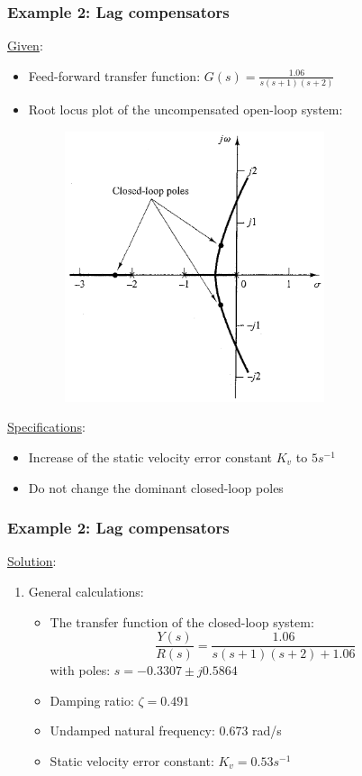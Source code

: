 \begin{frame}
	\frametitle{Example 2: Lag compensators}
	\underline{Given}:
	\begin{itemize}
		\item Feed-forward transfer function: $G(s)=\frac{1.06}{s(s+1)(s+2)}$
		\item Root locus plot of the uncompensated open-loop system:
		\begin{figure}
			\centering
			\includegraphics[width=0.3\linewidth]{Ex2_rootlocus}
		\end{figure}
	\end{itemize}
	\underline{Specifications}:
	\begin{itemize}
		\item Increase of the static velocity error constant $K_v$ to $5s^{-1}$
		\item Do not change the dominant closed-loop poles
	\end{itemize}
\end{frame}

\begin{frame}
	\frametitle{Example 2: Lag compensators}
	\underline{Solution}:
	\begin{enumerate}
		\item General calculations:
		\begin{itemize}
			\item The transfer function of the closed-loop system:
			$$\frac{Y(s)}{R(s)}=\frac{1.06}{s(s+1)(s+2)+1.06}$$ with poles: $s=-0.3307\pm j0.5864$
			\item Damping ratio: $\zeta=0.491$
			\item Undamped natural frequency: 0.673 rad/s
			\item Static velocity error constant: $K_v=0.53s^{-1}$
		\end{itemize}
	\end{enumerate}
\end{frame}

